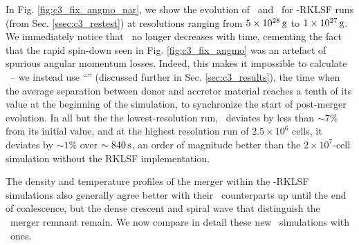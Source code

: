 In Fig. \ref{fig:c3_fix_angmo_nar}, we show the evolution of \Lztot\ and \Lzinner\ for \arepo-RKLSF runs (from Sec. \ref{ssec:c3_restest}) at resolutions ranging from $5\times10^{28}\,\mathrm{g}$ to $1\times10^{27}\,\mathrm{g}$.  We immediately notice that \Lzinner\ no longer decreases with time, cementing the fact that the rapid spin-down seen in Fig. \ref{fig:c3_fix_angmo} was an artefact of spurious angular momentum losses.  Indeed, this makes it impossible to calculate \tlm\ -- we instead use ``\tcoal'' (discussed further in Sec. \ref{sec:c3_results}), the time when the average separation between donor and accretor material reaches a tenth of its value at the beginning of the simulation, to synchronize the start of post-merger evolution.  In all but the the lowest-resolution run, \Lztot\ deviates by less than $\sim7$\% from its initial value, and at the highest resolution run of $2.5\times10^6$ cells, it deviates by $\sim1$\% over $\sim840\,\mathrm{s}$, an order of magnitude better than the $2\times10^7$-cell simulation without the RKLSF implementation.

The density and temperature profiles of the merger within the \arepo-RKLSF simulations also generally agree better with their \gasoline\ counterparts up until the end of coalescence, but the dense crescent and spiral wave that distinguish the \arepo\ merger remnant remain.  We now compare in detail these new \arepo\ simulations with \gasoline\ ones.

